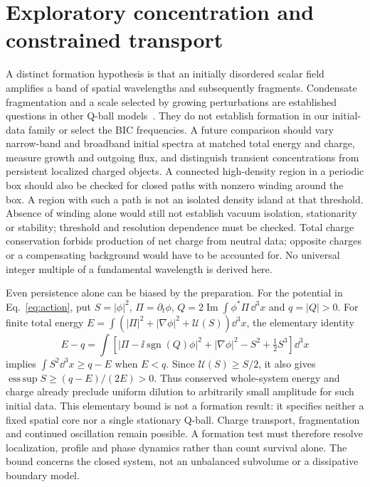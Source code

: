 \section{Exploratory concentration and constrained transport}\label{app:formation}
A distinct formation hypothesis is that an initially disordered scalar
field amplifies a band of spatial wavelengths and subsequently fragments.
Condensate fragmentation and a scale selected by growing perturbations
are established questions in other Q-ball models~\cite{KasuyaKawasaki2000}.
They do not establish formation in our initial-data family or select the
BIC frequencies. A future comparison should vary narrow-band and broadband
initial spectra at matched total energy and charge, measure growth and
outgoing flux, and distinguish transient concentrations from persistent
localized charged objects. A connected high-density region in a periodic
box should also be checked for closed paths with nonzero winding around
the box. A region with such a path is not an isolated density island at
that threshold. Absence of winding alone would still not establish vacuum
isolation, stationarity or stability; threshold and resolution dependence
must be checked. Total charge conservation forbids production
of net charge from neutral data; opposite charges or a compensating
background would have to be accounted for. No universal integer multiple
of a fundamental wavelength is derived here.

Even persistence alone can be biased by the preparation. For the potential
in Eq.~\eqref{eq:action}, put $S=|\phi|^2$, $\Pi=\partial_t\phi$,
$Q=2\operatorname{Im}\int\phi^*\Pi\,\dd^3x$ and $q=|Q|>0$.
For finite total energy $E=\int(|\Pi|^2+|\nabla\phi|^2+\mathcal U(S))\dd^3x$,
the elementary identity
\[
 E-q=\int\!\left[|\Pi-\ii\operatorname{sgn}(Q)\phi|^2
       +|\nabla\phi|^2-S^2+\tfrac12S^3\right]\dd^3x
\]
implies $\int S^2\dd^3x\ge q-E$ when $E<q$.
Since $\mathcal U(S)\ge S/2$, it also gives
$\operatorname{ess\,sup} S\ge(q-E)/(2E)>0$.
Thus conserved whole-system energy and charge already preclude uniform
dilution to arbitrarily small amplitude for such initial data. This elementary
bound is not a formation result: it specifies neither a
fixed spatial core nor a single stationary Q-ball. Charge transport,
fragmentation and continued oscillation remain possible. A formation test
must therefore resolve localization, profile and phase dynamics rather
than count survival alone. The bound concerns the closed system, not an
unbalanced subvolume or a dissipative boundary model.

